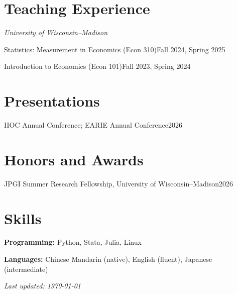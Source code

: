 \documentclass[11pt,letterpaper]{article}
\newcommand{\entry}[2]{\noindent #1\hfill #2\par\vspace{3pt}}
\begin{document}
\section{Teaching Experience}

\textit{University of Wisconsin--Madison}\par\vspace{3pt}
\entry{Statistics: Measurement in Economics (Econ 310)}{Fall 2024, Spring 2025}
\entry{Introduction to Economics (Econ 101)}{Fall 2023, Spring 2024}

\section{Presentations}

\entry{IIOC Annual Conference; EARIE Annual Conference}{2026}

\section{Honors and Awards}

\entry{JPGI Summer Research Fellowship, University of Wisconsin--Madison}{2026}

\section{Skills}

\entry{\textbf{Programming:} Python, Stata, Julia, Linux}{}
\entry{\textbf{Languages:} Chinese Mandarin (native), English (fluent), Japanese (intermediate)}{}


\vfill
{\small\textit{Last updated: \today}}
\end{document}
